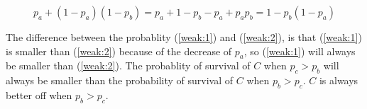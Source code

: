 \documentclass[letterpaper]{article}
\begin{document}
\begin{equation}
    \label{weak:2}
    p_a + (1 - p_a)(1 - p_b) =
    p_a + 1 - p_b - p_a + p_ap_b = 1 - p_b(1 - p_a)
\end{equation}

The difference between the probablity (\ref{weak:1}) and (\ref{weak:2}),
is that
(\ref{weak:1}) is smaller than (\ref{weak:2})
because of the decrease of $p_a$, so (\ref{weak:1}) will
always be smaller than (\ref{weak:2}). The probablity of
survival of $C$ when $p_c > p_b$ will always be smaller than
the probability of survival of $C$ when $p_b > p_c$. $C$ is always better off
when $p_b > p_c$.
\end{document}
